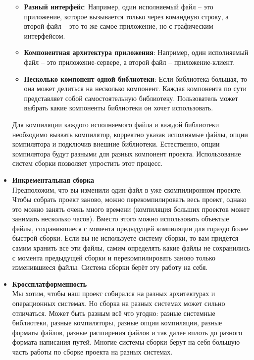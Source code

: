 \documentclass{article}
\begin{document}
\begin{itemize}
\begin{itemize}
\item \textbf{Разный интерфейс}: Например, один исполняемый файл -- это приложение, которое вызывается только через командную строку, а второй файл -- это то же самое приложение, но с графическим интерфейсом.

\item \textbf{Компонентная архитектура приложения}: Например, один исполняемый файл -- это приложение-сервере, а второй файл -- приложение-клиент.

\item \textbf{Несколько компонент одной библиотеки}: Если библиотека большая, то она может делиться на несколько компонент. Каждая компонента по сути представляет собой самостоятельную библиотеку. Пользователь может выбрать какие компоненты библиотеки он хочет использовать.
\end{itemize}
Для компиляции каждого исполняемого файла и каждой библиотеки необходимо вызвать компилятор, корректно указав исполнямые файлы, опции компилятора и подключив внешние библиотеки. Естественно, опции компилятора будут разными для разных компонент проекта. Использование систем сборки позволяет упростить этот процесс.

\item \textbf{Инкрементальная сборка}\\
Предположим, что вы изменили один файл в уже скомпилиронном проекте. Чтобы собрать проект заново, можно перекомпилировать весь проект, однако это можно занять очень много времени (компиляция больших проектов может занимать несколько часов). Вместо этого можно использовать объектые файлы, сохранившиеся с момента предыдущей компиляции для гораздо более быстрой сборки. Если вы не используете систему сборки, то вам придётся самим хранить все эти файлы, самим определять какие файлы не сохранились с момента предыдущей сборки и перекомпилировать заново только изменившиеся файлы. Система сборки берёт эту работу на себя.


\item \textbf{Кроссплатформенность}\\
Мы хотим, чтобы наш проект собирался на разных архитектурах и операционных системах. Но сборка на разных системах может сильно отличаться. Может быть разным всё что угодно: разные системные библиотеки, разные компиляторы, разные опции компиляции, разные форматы файлов, разные расширения файлов и так далее вплоть до разного формата написания путей. Многие системы сборки берут на себя большую часть работы по сборке проекта на разных системах.



\end{itemize}
\end{document}
